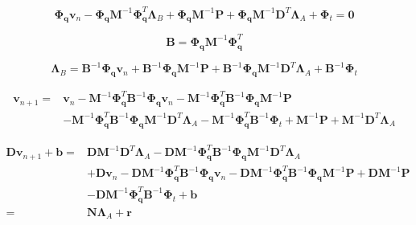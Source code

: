 \documentclass[12pt]{article}
\begin{document}
        $$\boldsymbol{\Phi}_{\mathbf{q}}\mathbf{v}_n-\boldsymbol{\Phi}_{\mathbf{q}}\mathbf{M}^{-1}\boldsymbol{\Phi}_{\mathbf{q}}^T\boldsymbol{\Lambda}_B
        +\boldsymbol{\Phi}_{\mathbf{q}}\mathbf{M}^{-1}\mathbf{P}+\boldsymbol{\Phi}_{\mathbf{q}}\mathbf{M}^{-1}\mathbf{D}^T\boldsymbol{\Lambda}_{A}+\boldsymbol{\Phi}_t=\mathbf{0}$$
        
        $$\mathbf{B}=\boldsymbol{\Phi}_{\mathbf{q}}\mathbf{M}^{-1}\boldsymbol{\Phi}_{\mathbf{q}}^T$$

        $$\boldsymbol{\Lambda}_B=\mathbf{B}^{-1}\boldsymbol{\Phi}_{\mathbf{q}}\mathbf{v}_n+
        \mathbf{B}^{-1}\boldsymbol{\Phi}_{\mathbf{q}}\mathbf{M}^{-1}\mathbf{P}+
        \mathbf{B}^{-1}\boldsymbol{\Phi}_{\mathbf{q}}\mathbf{M}^{-1}\mathbf{D}^T\boldsymbol{\Lambda}_{A}+
        \mathbf{B}^{-1}\boldsymbol{\Phi}_t$$

        \begin{equation}
            \begin{aligned}
                \mathbf{v}_{n+1}=&\mathbf{v}_n-\mathbf{M}^{-1}\boldsymbol{\Phi}_{\mathbf{q}}^T
                \mathbf{B}^{-1}\boldsymbol{\Phi}_{\mathbf{q}}\mathbf{v}_n
                -\mathbf{M}^{-1}\boldsymbol{\Phi}_{\mathbf{q}}^T\mathbf{B}^{-1}\boldsymbol{\Phi}_{\mathbf{q}}\mathbf{M}^{-1}\mathbf{P}\\
                &-\mathbf{M}^{-1}\boldsymbol{\Phi}_{\mathbf{q}}^T\mathbf{B}^{-1}\boldsymbol{\Phi}_{\mathbf{q}}\mathbf{M}^{-1}\mathbf{D}^T\boldsymbol{\Lambda}_{A}
                -\mathbf{M}^{-1}\boldsymbol{\Phi}_{\mathbf{q}}^T\mathbf{B}^{-1}\boldsymbol{\Phi}_t
                +\mathbf{M}^{-1}\mathbf{P}+\mathbf{M}^{-1}\mathbf{D}^T\boldsymbol{\Lambda}_{A}
            \end{aligned}
        \end{equation}

        \begin{equation}
            \begin{aligned}
                \mathbf{Dv}_{n+1}+\mathbf{b}=&\mathbf{D}\mathbf{M}^{-1}\mathbf{D}^T\boldsymbol{\Lambda}_{A}
                -\mathbf{D}\mathbf{M}^{-1}\boldsymbol{\Phi}_{\mathbf{q}}^T\mathbf{B}^{-1}\boldsymbol{\Phi}_{\mathbf{q}}\mathbf{M}^{-1}\mathbf{D}^T\boldsymbol{\Lambda}_{A}\\
                &+\mathbf{D}\mathbf{v}_n-\mathbf{D}\mathbf{M}^{-1}\boldsymbol{\Phi}_{\mathbf{q}}^T
                \mathbf{B}^{-1}\boldsymbol{\Phi}_{\mathbf{q}}\mathbf{v}_n
                -\mathbf{D}\mathbf{M}^{-1}\boldsymbol{\Phi}_{\mathbf{q}}^T\mathbf{B}^{-1}\boldsymbol{\Phi}_{\mathbf{q}}\mathbf{M}^{-1}\mathbf{P}
                +\mathbf{D}\mathbf{M}^{-1}\mathbf{P}\\
                &-\mathbf{D}\mathbf{M}^{-1}\boldsymbol{\Phi}_{\mathbf{q}}^T\mathbf{B}^{-1}\boldsymbol{\Phi}_t
                +\mathbf{b}\\
                =&\mathbf{N}\boldsymbol{\Lambda}_A+\mathbf{r}
            \end{aligned}
        \end{equation}
\end{document}
